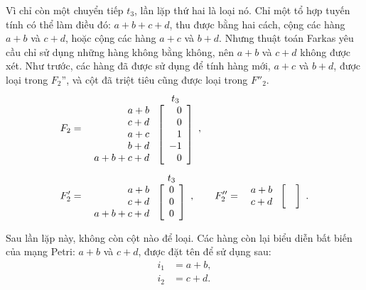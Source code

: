 Vì chỉ còn một chuyển tiếp $t_3$, lần lặp thứ hai là loại nó. Chỉ một tổ hợp tuyến tính có thể làm điều đó: $a+b+c+d$, thu được bằng hai cách, cộng các hàng $a+b$ và $c+d$, hoặc cộng các hàng $a+c$ và $b+d$. Nhưng thuật toán Farkas yêu cầu chỉ sử dụng những hàng không bằng không, nên $a+b$ và $c+d$ không được xét. Như trước, các hàng đã được sử dụng để tính hàng mới, $a+c$ và $b+d$, được loại trong $F_2$'', và cột đã triệt tiêu cũng được loại trong $F''_2$.
\[
\begin{aligned}
F_2&=\begin{array}{r@{\ }c}&t_3\\
\begin{array}{r}a+b\\c+d\\a+c\\b+d\\a+b+c+d\end{array}&
\left[\begin{array}{r}0\\0\\1\\-1\\0\end{array}\right]\end{array},\\[1ex]
F'_2&=\begin{array}{r@{\ }c}&t_3\\
\begin{array}{r}a+b\\c+d\\a+b+c+d\end{array}&
\left[\begin{array}{r}0\\0\\0\end{array}\right]\end{array},\qquad
F''_2=\begin{array}{r@{\ }c}
\begin{array}{r}a+b\\c+d\end{array}&\left[\begin{array}{c}\vphantom{0}\\\vphantom{0}\end{array}\right]
\end{array}.
\end{aligned}
\]

Sau lần lặp này, không còn cột nào để loại. Các hàng còn lại biểu diễn bất biến của mạng Petri: $a+b$ và $c+d$, được đặt tên để sử dụng sau:
\[
\begin{aligned}i_1&=a+b,\\i_2&=c+d.\end{aligned}
\]

